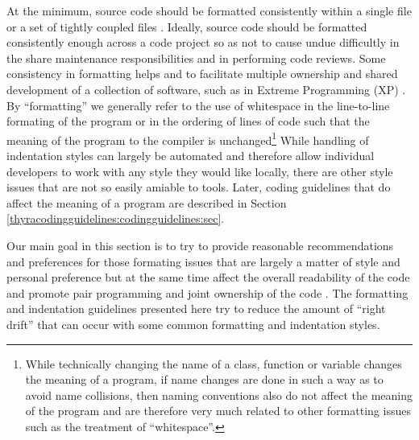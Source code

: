 At the minimum, source code should be formatted consistently within a single
file or a set of tightly coupled files {}\cite[Item 0]{C++CodingStandards05}.
Ideally, source code should be formatted consistently enough across a code
project so as not to cause undue difficultly in the share maintenance
responsibilities and in performing code reviews.  Some consistency in
formatting helps and to facilitate multiple ownership and shared development
of a collection of software, such as in Extreme Programming (XP)
{}\cite{ExtremeProgramming}.  By ``formatting'' we generally refer to the use
of whitespace in the line-to-line formating of the program or in the ordering
of lines of code such that the meaning of the program to the compiler is
unchanged\footnote{While technically changing the name of a class, function
or variable changes the meaning of a program, if name changes are done in such
a way as to avoid name collisions, then naming conventions also do not affect
the meaning of the program and are therefore very much related to other
formatting issues such as the treatment of ``whitespace''.}  While handling of
indentation styles can largely be automated {}\cite{ArtisticStyle} and
therefore allow individual developers to work with any style they would like
locally, there are other style issues that are not so easily amiable to
tools.  Later, coding guidelines that do affect the meaning of a program are
described in Section {}\ref{thyracodingguidelines:codingguidelines:sec}.

Our main goal in this section is to try to provide reasonable recommendations
and preferences for those formating issues that are largely a matter of style
and personal preference but at the same time affect the overall readability of
the code and promote pair programming and joint ownership of the code
{}\cite{ExtremeProgramming}.  The formatting and indentation guidelines
presented here try to reduce the amount of ``right drift'' that can occur with
some common formatting and indentation styles.

